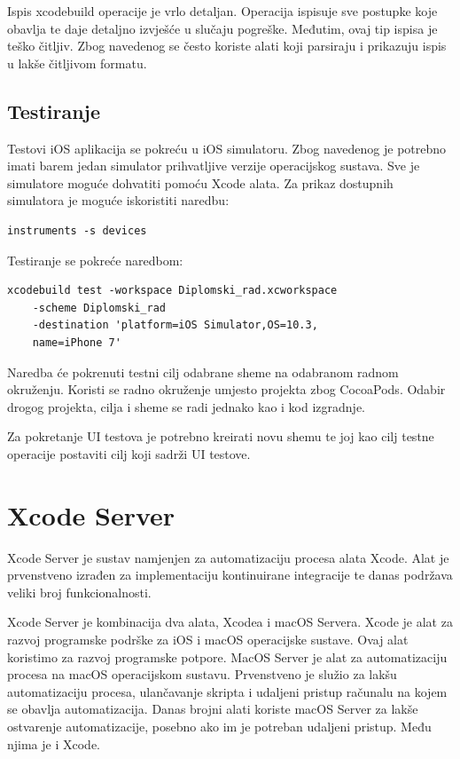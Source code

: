 \documentclass[times, utf8, diplomski, numeric]{fer}
\begin{document}
\begin{appendices}
Ispis xcodebuild operacije je vrlo detaljan. Operacija ispisuje sve postupke koje obavlja te daje detaljno izvješće u slučaju pogreške. Međutim, ovaj tip ispisa je teško čitljiv. Zbog navedenog se često koriste alati koji parsiraju i prikazuju ispis u lakše čitljivom formatu.

\section{Testiranje}

Testovi iOS aplikacija se pokreću u iOS simulatoru. Zbog navedenog je potrebno imati barem jedan simulator prihvatljive verzije operacijskog sustava. Sve je simulatore moguće dohvatiti pomoću Xcode alata. Za prikaz dostupnih simulatora je moguće iskoristiti naredbu:
\begin{verbatim}
instruments -s devices
\end{verbatim}

Testiranje se pokreće naredbom:
\begin{verbatim}
xcodebuild test -workspace Diplomski_rad.xcworkspace
    -scheme Diplomski_rad
    -destination 'platform=iOS Simulator,OS=10.3,
    name=iPhone 7'
\end{verbatim}

Naredba će pokrenuti testni cilj odabrane sheme na odabranom radnom okruženju. Koristi se radno okruženje umjesto projekta zbog CocoaPods. Odabir drogog projekta, cilja i sheme se radi jednako kao i kod izgradnje.

Za pokretanje UI testova je potrebno kreirati novu shemu te joj kao cilj testne operacije postaviti cilj koji sadrži UI testove.

\chapter{Xcode Server}

Xcode Server je sustav namjenjen za automatizaciju procesa alata Xcode. Alat je prvenstveno izrađen za implementaciju kontinuirane integracije te danas podržava veliki broj funkcionalnosti.

Xcode Server je kombinacija dva alata, Xcodea i macOS Servera. Xcode je alat za razvoj programske podrške za iOS i macOS operacijske sustave. Ovaj alat koristimo za razvoj programske potpore. MacOS Server je alat za automatizaciju procesa na macOS operacijskom sustavu. Prvenstveno je služio za lakšu automatizaciju procesa, ulančavanje skripta i udaljeni pristup računalu na kojem se obavlja automatizacija. Danas brojni alati koriste macOS Server za lakše ostvarenje automatizacije, posebno ako im je potreban udaljeni pristup. Među njima je i Xcode.


\end{appendices}
\end{document}
